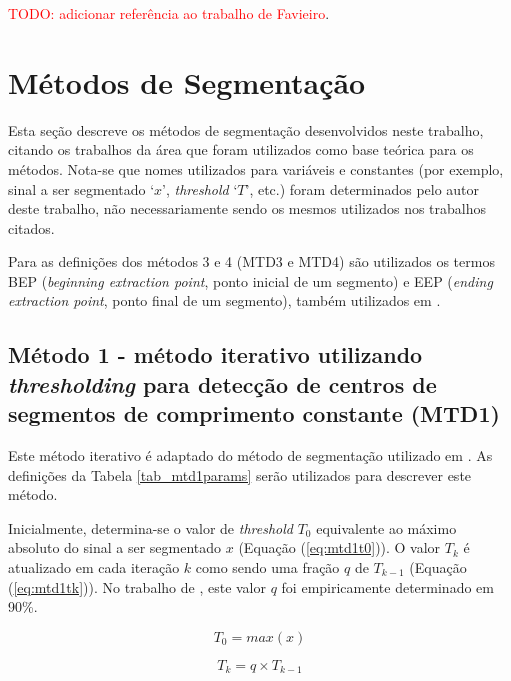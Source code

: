 \textcolor{red}{TODO: adicionar referência ao trabalho de Favieiro}.

		\section{Métodos de Segmentação}
\label{sec:MTDs}
Esta seção descreve os métodos de segmentação desenvolvidos neste trabalho, citando os trabalhos da área que foram utilizados como base teórica para os métodos. Nota-se que nomes utilizados para variáveis e constantes (por exemplo, sinal a ser segmentado `$x$', \emph{threshold} `$T$', etc.) foram determinados pelo autor deste trabalho, não necessariamente sendo os mesmos utilizados nos trabalhos citados.

Para as definições dos métodos 3 e 4 (MTD3 e MTD4) são utilizados os termos BEP (\emph{beginning extraction point}, ponto inicial de um segmento) e EEP (\emph{ending extraction point}, ponto final de um segmento), também utilizados em \cite{Pattichis1995}.
	
				\subsection{Método 1 - método iterativo utilizando \emph{thresholding} para detecção de centros de segmentos de comprimento constante (MTD1)}
Este método iterativo é adaptado do método de segmentação utilizado em \cite{Chauvet2001}. As definições da Tabela \ref{tab_mtd1params} serão utilizados para descrever este método.



Inicialmente, determina-se o valor de \emph{threshold} $T_0$ equivalente ao máximo absoluto do sinal a ser segmentado $x$ (Equação (\ref{eq:mtd1t0})). O valor $T_k$ é atualizado em cada iteração $k$ como sendo uma fração $q$ de $T_{k-1}$ (Equação (\ref{eq:mtd1tk})). No trabalho de \cite{Chauvet2001}, este valor $q$ foi empiricamente determinado em 90\%.

\begin{equation}
\label{eq:mtd1t0}
  T_0 = max(x)
\end{equation}

\begin{equation}
\label{eq:mtd1tk}
  T_k = q \times T_{k-1}
\end{equation}

